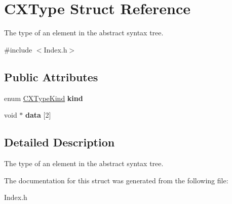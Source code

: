 \hypertarget{structCXType}{}\section{C\+X\+Type Struct Reference}
\label{structCXType}


The type of an element in the abstract syntax tree.  




{\ttfamily \#include $<$Index.\+h$>$}

\subsection*{Public Attributes}
\begin{DoxyCompactItemize}
\item 
\mbox{\label{structCXType_ab27a7510dc88b0ec80cff04ec89901aa}} 
enum \hyperlink{group__CINDEX__TYPES_gaad39de597b13a18882c21860f92b095a}{C\+X\+Type\+Kind} {\bfseries kind}
\item 
\mbox{\label{structCXType_ada63ea0defe2c7ace925b0d15df29aa9}} 
void $\ast$ {\bfseries data} \mbox{[}2\mbox{]}
\end{DoxyCompactItemize}


\subsection{Detailed Description}
The type of an element in the abstract syntax tree. 

The documentation for this struct was generated from the following file\+:\begin{DoxyCompactItemize}
\item 
Index.\+h\end{DoxyCompactItemize}
